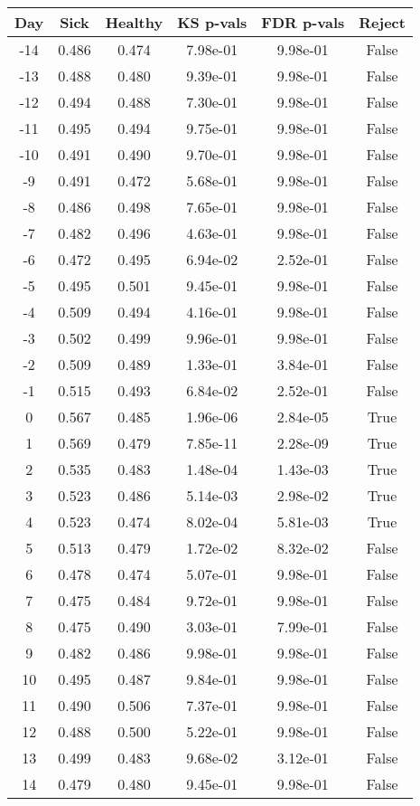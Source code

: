 \begin{tabular}{c|c|c|c|c|c}
Day &  Sick & Healthy &  KS p-vals & FDR p-vals & Reject\\
\hline
-14 & 0.486 &   0.474 &   7.98e-01 &   9.98e-01 &  False\\
-13 & 0.488 &   0.480 &   9.39e-01 &   9.98e-01 &  False\\
-12 & 0.494 &   0.488 &   7.30e-01 &   9.98e-01 &  False\\
-11 & 0.495 &   0.494 &   9.75e-01 &   9.98e-01 &  False\\
-10 & 0.491 &   0.490 &   9.70e-01 &   9.98e-01 &  False\\
 -9 & 0.491 &   0.472 &   5.68e-01 &   9.98e-01 &  False\\
 -8 & 0.486 &   0.498 &   7.65e-01 &   9.98e-01 &  False\\
 -7 & 0.482 &   0.496 &   4.63e-01 &   9.98e-01 &  False\\
 -6 & 0.472 &   0.495 &   6.94e-02 &   2.52e-01 &  False\\
 -5 & 0.495 &   0.501 &   9.45e-01 &   9.98e-01 &  False\\
 -4 & 0.509 &   0.494 &   4.16e-01 &   9.98e-01 &  False\\
 -3 & 0.502 &   0.499 &   9.96e-01 &   9.98e-01 &  False\\
 -2 & 0.509 &   0.489 &   1.33e-01 &   3.84e-01 &  False\\
 -1 & 0.515 &   0.493 &   6.84e-02 &   2.52e-01 &  False\\
  0 & 0.567 &   0.485 &   1.96e-06 &   2.84e-05 &   True\\
  1 & 0.569 &   0.479 &   7.85e-11 &   2.28e-09 &   True\\
  2 & 0.535 &   0.483 &   1.48e-04 &   1.43e-03 &   True\\
  3 & 0.523 &   0.486 &   5.14e-03 &   2.98e-02 &   True\\
  4 & 0.523 &   0.474 &   8.02e-04 &   5.81e-03 &   True\\
  5 & 0.513 &   0.479 &   1.72e-02 &   8.32e-02 &  False\\
  6 & 0.478 &   0.474 &   5.07e-01 &   9.98e-01 &  False\\
  7 & 0.475 &   0.484 &   9.72e-01 &   9.98e-01 &  False\\
  8 & 0.475 &   0.490 &   3.03e-01 &   7.99e-01 &  False\\
  9 & 0.482 &   0.486 &   9.98e-01 &   9.98e-01 &  False\\
 10 & 0.495 &   0.487 &   9.84e-01 &   9.98e-01 &  False\\
 11 & 0.490 &   0.506 &   7.37e-01 &   9.98e-01 &  False\\
 12 & 0.488 &   0.500 &   5.22e-01 &   9.98e-01 &  False\\
 13 & 0.499 &   0.483 &   9.68e-02 &   3.12e-01 &  False\\
 14 & 0.479 &   0.480 &   9.45e-01 &   9.98e-01 &  False\\
\end{tabular}
